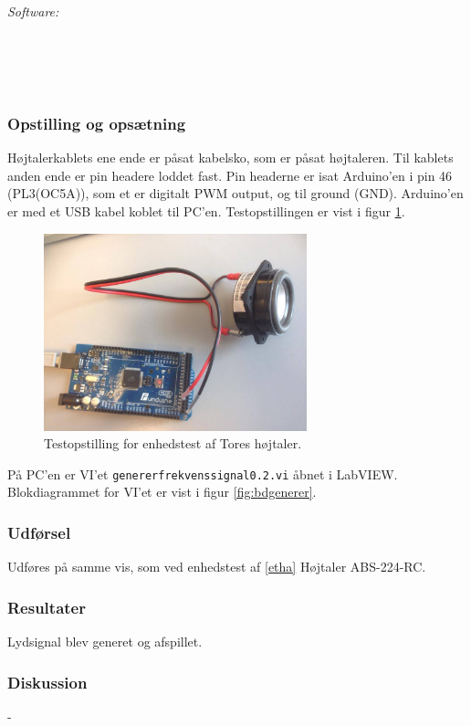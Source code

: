 		\textit{Software:}\\
		\labview\\
		\visa\\
		\vi\\
		\ardsw\
	
		\subsubsection{Opstilling og opsætning}
		Højtalerkablets ene ende er påsat kabelsko, som er påsat højtaleren. Til kablets anden ende er pin headere loddet fast. Pin headerne er isat Arduino'en i pin 46 (PL3(OC5A)), som et er digitalt PWM output, og til ground (GND). 
		Arduino'en er med et USB kabel koblet til PC'en. Testopstillingen er vist i figur \ref{fig:ethb}.\\ 
	  
			\begin{figure}[htb]
			\centering
				\includegraphics[width=3in]{hbArduino}
				\caption{Testopstilling for enhedstest af Tores højtaler.}	
				\label{fig:ethb}
			\end{figure}
	
		På PC'en er VI'et \texttt{genererfrekvenssignal0.2.vi} åbnet i LabVIEW. Blokdiagrammet for VI'et er vist i figur \ref{fig:bdgenerer}.   \\   
	
		
	
		\subsubsection{Udførsel}
			Udføres på samme vis, som ved enhedstest af \ref{etha} Højtaler ABS-224-RC. 
			
		\subsubsection{Resultater}
		Lydsignal blev generet og afspillet. 
		\subsubsection{Diskussion} 
		-
